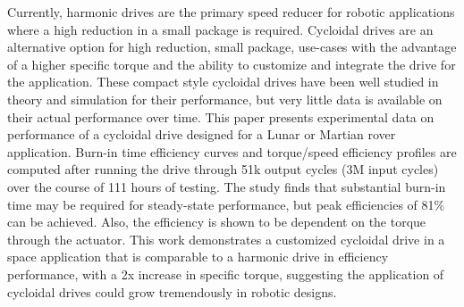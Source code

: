 Currently, harmonic drives are the primary speed reducer for robotic applications where a high reduction in a small package is required. 
Cycloidal drives are an alternative option for high reduction, small package, use-cases with the advantage of a higher specific torque and the ability to customize and integrate the drive for the application.
These compact style cycloidal drives have been well studied in theory and simulation for their performance, but very little data is available on their actual performance over time. 
This paper presents experimental data on performance of a cycloidal drive designed for a Lunar or Martian rover application. 
Burn-in time efficiency curves and torque/speed efficiency profiles are computed after running the drive through 51k output cycles (3M input cycles) over the course of 111 hours of testing. 
The study finds that substantial burn-in time may be required for steady-state performance, but peak efficiencies of 81\% can be achieved. 
Also, the efficiency is shown to be dependent on the torque through the actuator.
This work demonstrates a customized cycloidal drive in a space application that is comparable to a harmonic drive in efficiency performance, with a 2x increase in specific torque, suggesting the application of cycloidal drives could grow tremendously in robotic designs. 